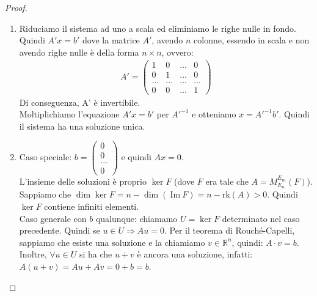 \documentclass[a4paper]{article}
\newcommand{\IM}{\ \mathrm{Im} \ }
\theoremstyle{definition}
\begin{document}
	\begin{proof}
		\begin{enumerate}
			\item Riduciamo il sistema ad uno a scala ed eliminiamo le righe nulle in fondo. \\
				Quindi $A'x = b'$ dove la matrice $A'$, avendo $n$ colonne, essendo in scala e non avendo righe nulle è della forma $n \times n$, ovvero:
				\begin{align*}
					A' = \begin{pmatrix}
						1 & 0 & ... & 0 \\
						0 & 1 & ... & 0 \\
						... & ... & ... & ... \\
						0 & 0 & ... & 1
					\end{pmatrix}
				\end{align*}
				Di conseguenza, A' è invertibile. \\
				Moltiplichiamo l'equazione $A'x = b'$ per $A'^{-1}$ e otteniamo $x = A'^{-1}b'$.
				Quindi il sistema ha una soluzione unica.
			\item Caso speciale: $b = \begin{pmatrix}
				0 \\
				0 \\
				... \\
				0
			\end{pmatrix}$ e quindi $Ax = 0$. \\
			L'insieme delle soluzioni è proprio $\ker F$ (dove $F$ era tale che $A = M_{E_n}^{E_m}(F)$).
			Sappiamo che $\dim \ker F = n - \dim(\IM F) = n - \text{rk}(A) > 0$. Quindi $\ker F$ contiene infiniti elementi. \\
			Caso generale con $b$ qualunque: chiamamo $U = \ker F$ determinato nel caso precedente. Quindi se $u \in U \Rightarrow Au = 0$.
			Per il teorema di Rouché-Capelli, sappiamo che esiste una soluzione e la chiamiamo $v \in \mathbb{R}^n$, quindi:
			$A \cdot v = b$. \\
			Inoltre, $\forall u \in U$ si ha che $u + v$ è ancora una soluzione, infatti:
			$A(u + v) = Au + Av = 0 + b = b$.
		\end{enumerate}
	\end{proof}
\end{document}
